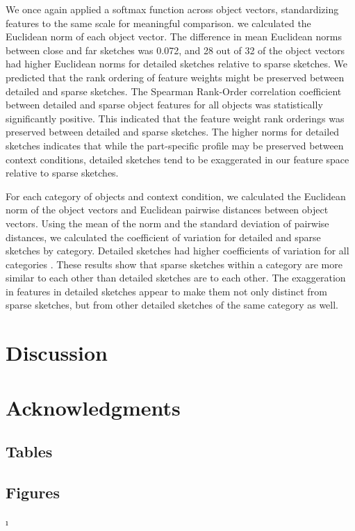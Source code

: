 \documentclass[10pt,letterpaper]{article}
\newcommand{\kushin}[1]{{\color{orange}{[kushin: #1]}}}
\begin{document}
We once again applied a softmax function across object vectors, standardizing features to the same scale for meaningful comparison.
we calculated the Euclidean norm of each object vector. The difference in mean Euclidean norms between close and far sketches was 0.072, and 28 out of 32 of the object vectors had higher Euclidean norms for detailed sketches relative to sparse sketches. We predicted that the rank ordering of feature weights might be preserved between detailed and sparse sketches. The Spearman Rank-Order correlation coefficient between detailed and sparse object features for all objects was statistically significantly positive. This indicated that the feature weight rank orderings was preserved between detailed and sparse sketches. The higher norms for detailed sketches indicates that while the part-specific profile may be preserved between context conditions, detailed sketches tend to be exaggerated in our feature space relative to sparse sketches.

For each category of objects and context condition, we calculated the Euclidean norm of the object vectors and Euclidean pairwise distances between object vectors. 
Using the mean of the norm and the standard deviation of pairwise distances, we calculated the coefficient of variation for detailed and sparse sketches by category. Detailed sketches had higher coefficients of variation for all categories \kushin{would report CV difference between close and far maybe?}.
These results show that sparse sketches within a category are more similar to each other than detailed sketches are to each other. 
The exaggeration in features in detailed sketches appear to make them not only distinct from sparse sketches, but from other detailed sketches of the same category as well.
 





\section{Discussion}

\section{Acknowledgments}

\subsection{Tables}

\subsection{Figures}




\setlength{\bibleftmargin}{.125in}
\setlength{\bibindent}{-\bibleftmargin}ı
\end{document}
